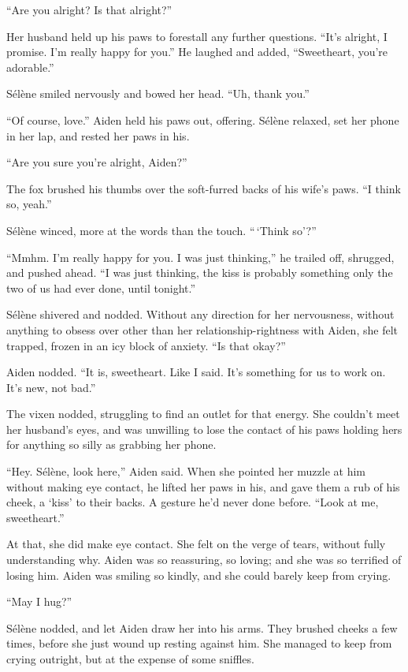 ``Are you alright? Is that alright?''

Her husband held up his paws to forestall any further questions. ``It's alright, I promise. I'm really happy for you.'' He laughed and added, ``Sweetheart, you're adorable.''

Sélène smiled nervously and bowed her head. ``Uh, thank you.''

``Of course, love.'' Aiden held his paws out, offering. Sélène relaxed, set her phone in her lap, and rested her paws in his.

``Are you sure you're alright, Aiden?''

The fox brushed his thumbs over the soft-furred backs of his wife's paws. ``I think so, yeah.''

Sélène winced, more at the words than the touch. ``\,`Think so'?''

``Mmhm. I'm really happy for you. I was just thinking,'' he trailed off, shrugged, and pushed ahead. ``I was just thinking, the kiss is probably something only the two of us had ever done, until tonight.''

Sélène shivered and nodded. Without any direction for her nervousness, without anything to obsess over other than her relationship-rightness with Aiden, she felt trapped, frozen in an icy block of anxiety. ``Is that okay?''

Aiden nodded. ``It is, sweetheart. Like I said. It's something for us to work on. It's new, not bad.''

The vixen nodded, struggling to find an outlet for that energy. She couldn't meet her husband's eyes, and was unwilling to lose the contact of his paws holding hers for anything so silly as grabbing her phone.

``Hey. Sélène, look here,'' Aiden said. When she pointed her muzzle at him without making eye contact, he lifted her paws in his, and gave them a rub of his cheek, a `kiss' to their backs. A gesture he'd never done before. ``Look at me, sweetheart.''

At that, she did make eye contact. She felt on the verge of tears, without fully understanding why. Aiden was so reassuring, so loving; and she was so terrified of losing him. Aiden was smiling so kindly, and she could barely keep from crying.

``May I hug?''

Sélène nodded, and let Aiden draw her into his arms. They brushed cheeks a few times, before she just wound up resting against him. She managed to keep from crying outright, but at the expense of some sniffles.

